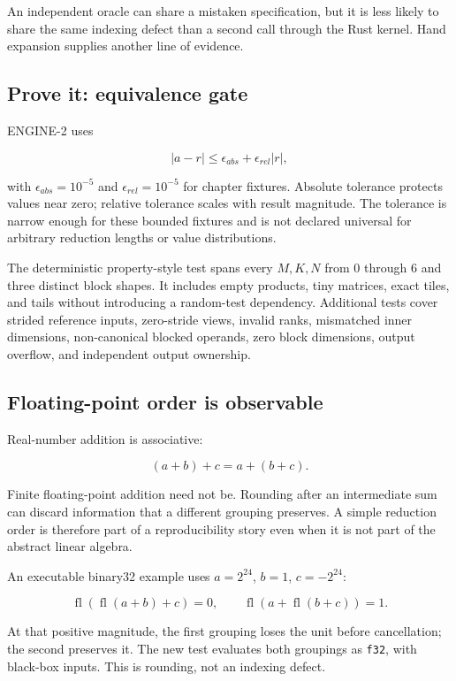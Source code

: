 \documentclass[
  10pt,
]{article}
\begin{document}
An independent oracle can share a mistaken specification, but it is less
likely to share the same indexing defect than a second call through the
Rust kernel. Hand expansion supplies another line of evidence.

\subsection{Prove it: equivalence gate}\label{prove-it-equivalence-gate}

ENGINE-2 uses

\[
|a-r|\le \epsilon_{abs}+\epsilon_{rel}|r|,
\]

with \(\epsilon_{abs}=10^{-5}\) and \(\epsilon_{rel}=10^{-5}\) for
chapter fixtures. Absolute tolerance protects values near zero; relative
tolerance scales with result magnitude. The tolerance is narrow enough
for these bounded fixtures and is not declared universal for arbitrary
reduction lengths or value distributions.

The deterministic property-style test spans every \(M,K,N\) from 0
through 6 and three distinct block shapes. It includes empty products,
tiny matrices, exact tiles, and tails without introducing a random-test
dependency. Additional tests cover strided reference inputs, zero-stride
views, invalid ranks, mismatched inner dimensions, non-canonical blocked
operands, zero block dimensions, output overflow, and independent output
ownership.

\subsection{Floating-point order is
observable}\label{floating-point-order-is-observable}

Real-number addition is associative:

\[
(a+b)+c=a+(b+c).
\]

Finite floating-point addition need not be. Rounding after an
intermediate sum can discard information that a different grouping
preserves. A simple reduction order is therefore part of a
reproducibility story even when it is not part of the abstract linear
algebra.

An executable binary32 example uses \(a=2^{24}\), \(b=1\),
\(c=-2^{24}\):

\[
\operatorname{fl}(\operatorname{fl}(a+b)+c)=0,
\qquad
\operatorname{fl}(a+\operatorname{fl}(b+c))=1.
\]

At that positive magnitude, the first grouping loses the unit before
cancellation; the second preserves it. The new test evaluates both
groupings as \texttt{f32}, with black-box inputs. This is rounding, not
an indexing defect.
\end{document}

